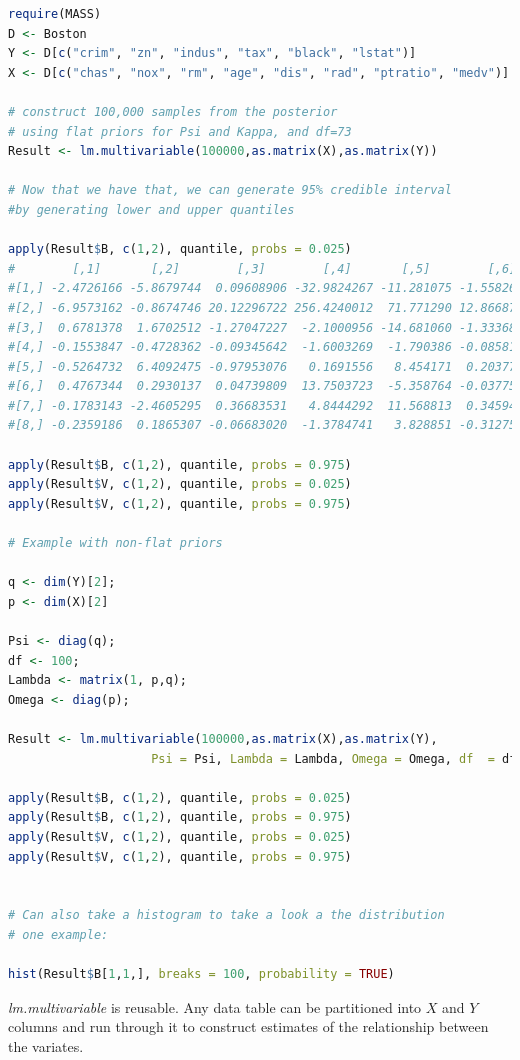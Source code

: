 \documentclass[english]{report}
\begin{document}
\begin{lstlisting}[frame=single, language=R]
require(MASS)
D <- Boston
Y <- D[c("crim", "zn", "indus", "tax", "black", "lstat")]
X <- D[c("chas", "nox", "rm", "age", "dis", "rad", "ptratio", "medv")]

# construct 100,000 samples from the posterior
# using flat priors for Psi and Kappa, and df=73
Result <- lm.multivariable(100000,as.matrix(X),as.matrix(Y))

# Now that we have that, we can generate 95% credible interval
#by generating lower and upper quantiles

apply(Result$B, c(1,2), quantile, probs = 0.025)
#        [,1]       [,2]        [,3]        [,4]       [,5]        [,6]
#[1,] -2.4726166 -5.8679744  0.09608906 -32.9824267 -11.281075 -1.55826198
#[2,] -6.9573162 -0.8674746 20.12296722 256.4240012  71.771290 12.86687197
#[3,]  0.6781378  1.6702512 -1.27047227  -2.1000956 -14.681060 -1.33368492
#[4,] -0.1553847 -0.4728362 -0.09345642  -1.6003269  -1.790386 -0.08581789
#[5,] -0.5264732  6.4092475 -0.97953076   0.1691556   8.454171  0.20377180
#[6,]  0.4767344  0.2930137  0.04739809  13.7503723  -5.358764 -0.03775675
#[7,] -0.1783143 -2.4605295  0.36683531   4.8444292  11.568813  0.34594612
#[8,] -0.2359186  0.1865307 -0.06683020  -1.3784741   3.828851 -0.31275303

apply(Result$B, c(1,2), quantile, probs = 0.975)
apply(Result$V, c(1,2), quantile, probs = 0.025)
apply(Result$V, c(1,2), quantile, probs = 0.975)

# Example with non-flat priors

q <- dim(Y)[2];
p <- dim(X)[2]

Psi <- diag(q);
df <- 100;
Lambda <- matrix(1, p,q);
Omega <- diag(p);

Result <- lm.multivariable(100000,as.matrix(X),as.matrix(Y), 
                    Psi = Psi, Lambda = Lambda, Omega = Omega, df  = df)
       
apply(Result$B, c(1,2), quantile, probs = 0.025)
apply(Result$B, c(1,2), quantile, probs = 0.975)
apply(Result$V, c(1,2), quantile, probs = 0.025)
apply(Result$V, c(1,2), quantile, probs = 0.975)


# Can also take a histogram to take a look a the distribution
# one example:

hist(Result$B[1,1,], breaks = 100, probability = TRUE)

\end{lstlisting}

\emph{lm.multivariable} is reusable. Any data table can be partitioned into $X$ and $Y$ columns and run through it to construct estimates of the relationship between the variates.
\end{document}
